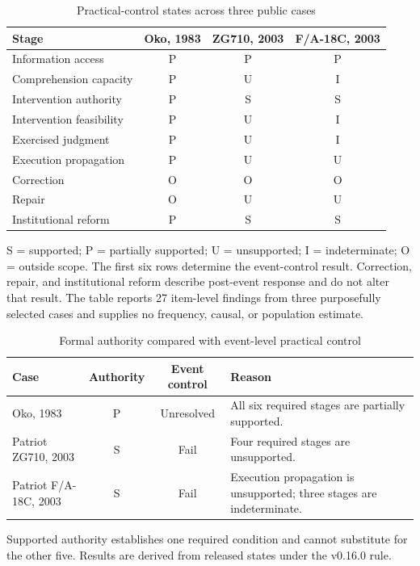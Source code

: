 \begin{table}[t]
\centering
\begin{threeparttable}
\caption{Practical-control states across three public cases}
\label{tab:practical-control}
\begin{tabular}{l c c c}
\toprule
Stage & Oko, 1983 & ZG710, 2003 & F/A-18C, 2003 \\
\midrule
Information access & P & P & P \\
Comprehension capacity & P & U & I \\
Intervention authority & P & S & S \\
Intervention feasibility & P & U & I \\
Exercised judgment & P & U & I \\
Execution propagation & P & U & U \\
\midrule
Correction & O & O & O \\
Repair & O & U & U \\
Institutional reform & P & S & S \\
\bottomrule
\end{tabular}
\begin{tablenotes}[flushleft]\footnotesize
\item S = supported; P = partially supported; U = unsupported; I = indeterminate; O = outside scope. The first six rows determine the event-control result. Correction, repair, and institutional reform describe post-event response and do not alter that result. The table reports 27 item-level findings from three purposefully selected cases and supplies no frequency, causal, or population estimate.
\end{tablenotes}
\end{threeparttable}
\end{table}

\begin{table}[t]
\centering
\begin{threeparttable}
\caption{Formal authority compared with event-level practical control}
\label{tab:authority-event-control}
\begin{tabularx}{\linewidth}{l c c X}
\toprule
Case & Authority & Event control & Reason \\
\midrule
Oko, 1983 & P & Unresolved & All six required stages are partially supported. \\
Patriot ZG710, 2003 & S & Fail & Four required stages are unsupported. \\
Patriot F/A-18C, 2003 & S & Fail & Execution propagation is unsupported; three stages are indeterminate. \\
\bottomrule
\end{tabularx}
\begin{tablenotes}[flushleft]\footnotesize
\item Supported authority establishes one required condition and cannot substitute for the other five. Results are derived from released states under the v0.16.0 rule.
\end{tablenotes}
\end{threeparttable}
\end{table}

